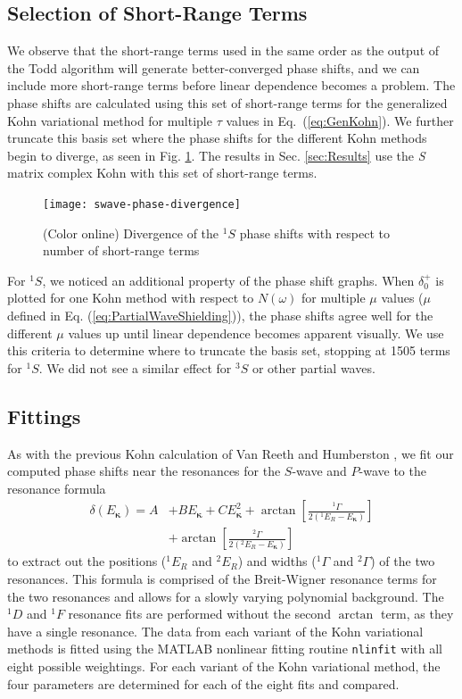 \documentclass[preprint,showpacs,showkeys,preprintnumbers,amsmath,amssymb,longbibliography,pra,aps]{revtex4-1}
\begin{document}
\subsection{Selection of Short-Range Terms}
\label{sec:Truncation}
We observe that the short-range terms used in the same order as the output of 
the Todd algorithm will generate better-converged phase shifts, and we can 
include more short-range terms before linear dependence becomes a problem. 
The phase shifts are calculated using this set of short-range terms for the 
generalized Kohn variational method for multiple $\tau$ values in
Eq.~(\ref{eq:GenKohn}). We further truncate this basis set where the phase
shifts for the different Kohn methods begin to diverge, as seen in
Fig. \ref{fig:swave-phase-divergence}. The results in Sec. \ref{sec:Results}
use the \emph{S} matrix complex Kohn with this set of short-range terms.

\begin{figure}[H]
	\centering
	\texttt{[image: swave-phase-divergence]}
	\caption{(Color online) Divergence of the $^1S$ phase shifts with respect
to number of short-range terms}
	\label{fig:swave-phase-divergence}
\end{figure}

For $^1S$, we noticed an additional property of the phase shift graphs. When
$\delta_0^+$ is plotted for one Kohn method with respect to $N(\omega)$ for 
multiple $\mu$ values ($\mu$ defined in Eq. (\ref{eq:PartialWaveShielding})), 
the phase shifts agree well for the different $\mu$ values up until linear 
dependence becomes apparent visually. We use this criteria to determine where 
to truncate the basis set, stopping at 1505 terms for $^1S$. We did not see a 
similar effect for $^3S$ or other partial waves.

\subsection{Fittings}
As with the previous Kohn calculation of Van Reeth and Humberston
\cite{VanReeth2004}, we fit our computed phase shifts near the resonances for
the $S$-wave and $P$-wave to the resonance formula
\begin{align}
\label{eq:ResonanceFit}
\delta(E_{\bm \kappa}) = A &+ B E_{\bm \kappa} + C E_{\bm \kappa}^2 + \arctan
  \left[ \frac{^1\Gamma}{2(^1E_R - E_{\bm \kappa})} \right]  \nonumber \\
& + \arctan \left[ \frac{^2\Gamma}{2(^2E_R - E_{\bm \kappa})} \right]
\end{align}
to extract out the positions ($^1E_R$ and $^2E_R$) and widths ($^1\Gamma$ and 
$^2\Gamma$) of the two resonances. This formula is comprised of the
Breit-Wigner resonance terms \cite{Breit1936,Macek1970} for the two resonances
and allows for a slowly varying polynomial background. The $^1D$ and $^1F$ 
resonance fits are performed without the second $\arctan$ term, as they have 
a single resonance. The data from each variant of the Kohn variational 
methods is fitted using the MATLAB \cite{MATLAB} nonlinear fitting routine 
\texttt{nlinfit} with all eight possible weightings. For each variant of the 
Kohn variational method, the four parameters are determined for each of the 
eight fits and compared.
\end{document}
